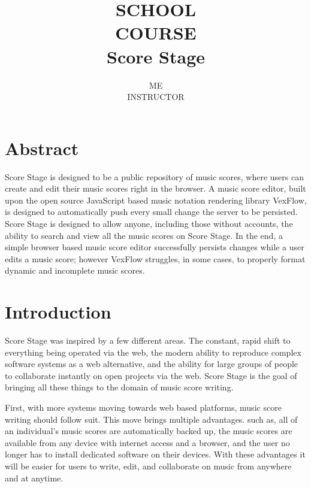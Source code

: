 \documentclass[letterpaper,12pt]{article}
\title{
    \vfill
    {\Large SCHOOL} \\
    {\Large COURSE} \\[0.75em]
    {\Huge Score Stage} \\
}
\author{
    ME \\
    INSTRUCTOR
}
\begin{document}
\begin{titlepage}
    \maketitle
    \vfill
    \thispagestyle{empty}
\end{titlepage}

\section*{Abstract}

Score Stage is designed to be a public repository of music scores, where users can create and edit their music scores
right in the browser. A music score editor, built upon the open source JavaScript based music notation rendering library
VexFlow, is designed to automatically push every small change the server to be persisted. Score Stage is designed to
allow anyone, including those without accounts, the ability to search and view all the music scores on Score Stage. In
the end, a simple browser based music score editor successfully persists changes while a user edits a music score;
however VexFlow struggles, in some cases, to properly format dynamic and incomplete music scores.

\thispagestyle{empty}
\newpage

\tableofcontents
\listoffigures

\thispagestyle{empty}
\newpage


\section{Introduction}

Score Stage was inspired by a few different areas. The constant, rapid shift to everything being operated via the web,
the modern ability to reproduce complex software systems as a web alternative, and the ability for large groups of
people to collaborate instantly on open projects via the web. Score Stage is the goal of bringing all these things to
the domain of music score writing.

First, with more systems moving towards web based platforms, music score writing should follow suit. This move brings
multiple advantages. such as, all of an individual's music scores are automatically backed up, the music scores are
available from any device with internet access and a browser, and the user no longer has to install dedicated software
on their devices. With these advantages it will be easier for users to write, edit, and collaborate on music from
anywhere and at anytime.
\end{document}
